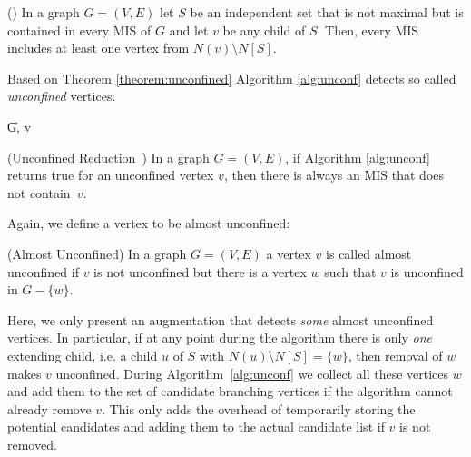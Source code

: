 \documentclass[a4paper,UKenglish,cleveref, autoref, thm-restate]{lipics-v2021}
\begin{document}
\begin{theorem} (\cite{XiaoUnconfined})\label{theorem:unconfined}
	In a graph $G=(V,E)$ let $S$ be an independent set that is not maximal but is contained in every MIS of $G$ and let $v$ be any child of $S$. Then, every MIS includes at least one vertex from $N(v)\setminus N[S]$.
\end{theorem}

Based on Theorem \ref{theorem:unconfined} Algorithm \ref{alg:unconf} detects so called \textit{unconfined} vertices.

\begin{algorithm}
	\caption{Unconfined -- Xiao and Nagamochi
      \cite{XiaoUnconfined}}\label{alg:unconf}
	\DontPrintSemicolon
	
	\U{G, v}	
	
	
\end{algorithm}


\begin{theorem}(Unconfined Reduction~\cite{XiaoUnconfined}) In a graph $G=(V,E)$,
  if Algorithm \ref{alg:unconf} returns true for an unconfined vertex $v$, then
  there is always an MIS that does not contain~$v$.
\end{theorem}

Again, we define a vertex to be almost unconfined:

\begin{definition} (Almost Unconfined)
  In a graph $G=(V,E)$ a vertex $v$ is called almost unconfined if $v$ is not unconfined but there is a vertex $w$ such that $v$ is unconfined in $G-\{w\}$.
\end{definition}

Here, we only present an augmentation that detects \emph{some} almost
unconfined vertices. In particular, if at any point during the algorithm there
is only \emph{one} extending child, i.e. a child $u$ of $S$ with $N(u)\setminus
N[S] = \{w\}$, then removal of $w$ makes $v$ unconfined. During
Algorithm~\ref{alg:unconf} we collect all these vertices $w$ and add them to the
set of candidate branching vertices if the algorithm cannot already remove $v$.
This only adds the overhead of temporarily storing the potential candidates and
adding them to the actual candidate list if $v$ is not removed.
\end{document}
